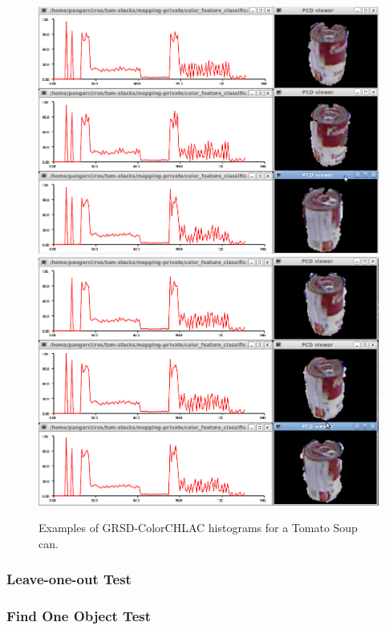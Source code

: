 \documentclass[conference]{sty/IEEEtran}
\begin{document}
\begin{figure}[htb!]
  \begin{center}
    \includegraphics[width=.9\columnwidth]{figures/colorCHLAC/real/tomato/tomato_hist_pcd.png}
    \includegraphics[width=.9\columnwidth]{figures/colorCHLAC/real/tomato/tomato_hist_pcd2.png}
    \caption{Examples of GRSD-ColorCHLAC histograms for a Tomato Soup can.}
    \label{fig:grsd_colorchlac_tomato}
  \end{center}
\end{figure}


\subsubsection{Leave-one-out Test}

\subsubsection{Find One Object Test}
\end{document}
